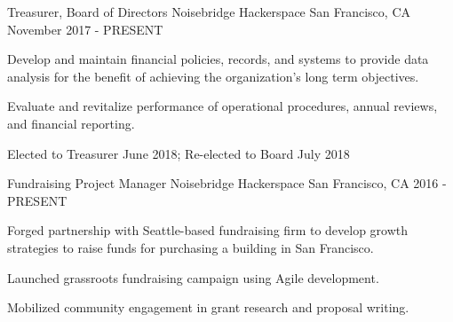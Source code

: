 

\begin{cventries}

  \cventry
    {Treasurer, Board of Directors} %
    {Noisebridge Hackerspace} %
    {San Francisco, CA} %
    {November 2017 - PRESENT} %
    {
      \begin{cvitems} %
        \item {Develop and maintain financial policies, records, and systems to provide data analysis for the benefit of achieving the organization's long term objectives.}
        \item {Evaluate and revitalize performance of operational procedures, annual reviews, and financial reporting.}
        \item {Elected to Treasurer June 2018; Re-elected to Board July 2018}       
      \end{cvitems}
    }

  \cventry
    {Fundraising Project Manager} %
    {Noisebridge Hackerspace} %
    {San Francisco, CA} %
    {2016 - PRESENT} %
    {
      \begin{cvitems} %
        \item {Forged partnership with Seattle-based fundraising firm to develop growth strategies to raise funds for purchasing a building in San Francisco.}
        \item {Launched grassroots fundraising campaign using Agile development.}
        \item {Mobilized community engagement in grant research and proposal writing.}
      \end{cvitems}
    }


\end{cventries}
